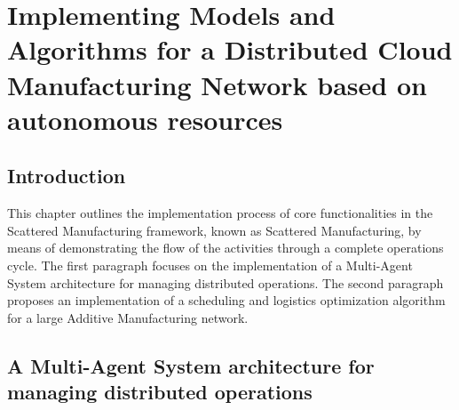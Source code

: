 \chapter{Implementing Models and Algorithms for a Distributed Cloud Manufacturing Network based on autonomous resources}
\section{Introduction}
This chapter outlines the implementation process of core functionalities in the Scattered Manufacturing framework, known as Scattered Manufacturing, by means of demonstrating the flow of the activities through a complete operations cycle. The first paragraph focuses on the implementation of a Multi-Agent System architecture for managing distributed operations. The second paragraph proposes an implementation of a scheduling and logistics optimization algorithm for a large Additive Manufacturing network.
\section{A Multi-Agent System architecture for managing distributed operations}
